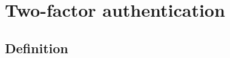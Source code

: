 \documentclass{article}
\begin{document}
        
        
        
        
    
	\clearpage
	\section{Two-factor authentication}
		\subsection{Definition}
        
    \clearpage
	\nocite{*}
	
	
\end{document}
